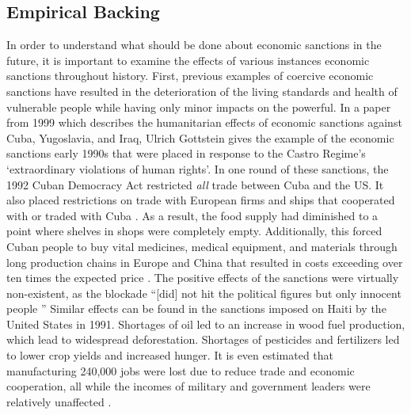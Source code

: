 \documentclass[12pt]{article}
\begin{document}
\subsection*{Empirical Backing}
In order to understand what should be done about economic sanctions in the future, it is important to examine the effects of various instances economic sanctions throughout history.
First, previous examples of coercive economic sanctions have resulted in the deterioration of the living standards and health of vulnerable people while having only minor impacts on the powerful.
In a paper from 1999 which describes the humanitarian effects of economic sanctions against Cuba, Yugoslavia, and Iraq, Ulrich Gottstein gives the example of the economic sanctions early 1990s that were placed in response to the Castro Regime’s `extraordinary violations of human rights'. 
In one round of these sanctions, the 1992 Cuban Democracy Act restricted \emph{all} trade between Cuba and the US\@.
It also placed restrictions on trade with European firms and ships that cooperated with or traded with Cuba \autocite[273]{gottstein1999}.
As a result, the food supply had diminished to a point where shelves in shops were completely empty.
Additionally, this forced Cuban people to buy vital medicines, medical equipment, and materials through long production chains in Europe and China that resulted in costs exceeding over ten times the expected price \autocite[274]{gottstein1999}.
The positive effects of the sanctions were virtually non-existent, as the blockade ``[did] not hit the political figures but only innocent people \autocite[275]{gottstein1999}''
Similar effects can be found in the sanctions imposed on Haiti by the United States in 1991.
Shortages of oil led to an increase in wood fuel production, which lead to widespread deforestation.
Shortages of pesticides and fertilizers led to lower crop yields and increased hunger.
It is even estimated that manufacturing 240,000 jobs were lost due to reduce trade and economic cooperation, all while the incomes of military and government leaders were relatively unaffected \autocite[27]{clawson1993}.
\end{document}

